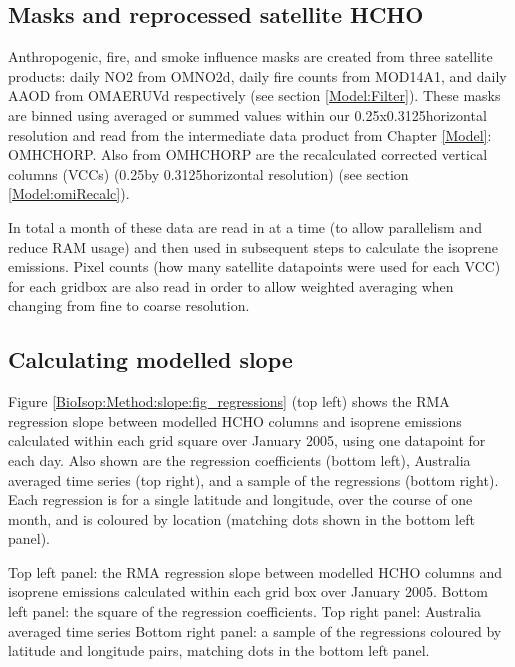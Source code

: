   \subsection{Masks and reprocessed satellite HCHO}

    Anthropogenic, fire, and smoke influence masks are created from three satellite products: daily NO2 from OMNO2d, daily fire counts from MOD14A1, and daily AAOD from OMAERUVd respectively (see section \ref{Model:Filter}). These masks are binned using averaged or summed values within our 0.25x0.3125\degr horizontal resolution and read from the intermediate data product from Chapter \ref{Model}: OMHCHORP.
    Also from OMHCHORP are the recalculated corrected vertical columns (VCCs) (0.25\degr by 0.3125\degr horizontal resolution) (see section \ref{Model:omiRecalc}).

    In total a month of these data are read in at a time (to allow parallelism and reduce RAM usage) and then used in subsequent steps to calculate the isoprene emissions.
    Pixel counts (how many satellite datapoints were used for each VCC) for each gridbox are also read in order to allow weighted averaging when changing from fine to coarse resolution.
    
  \subsection{Calculating modelled slope}
  \label{BioIsop:Method:slope}
  
    Figure \ref{BioIsop:Method:slope:fig_regressions} (top left) shows the RMA regression slope between modelled HCHO columns and isoprene emissions calculated within each grid square over January 2005, using one datapoint for each day.
    Also shown are the regression coefficients (bottom left), Australia averaged time series (top right), and a sample of the regressions (bottom right).
    Each regression is for a single latitude and longitude, over the course of one month, and is coloured by location (matching dots shown in the bottom left panel).
    
    { %
      Top left panel: the RMA regression slope between modelled HCHO columns and isoprene emissions calculated within each grid box over January 2005.
      Bottom left panel: the square of the regression coefficients.
      Top right panel: Australia averaged time series 
      Bottom right panel: a sample of the regressions coloured by latitude and longitude pairs, matching dots in the bottom left panel.
    }
    {\label{BioIsop:Method:slope:fig_regressions}}
  
